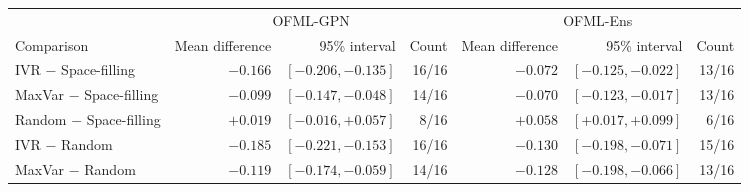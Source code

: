 \begin{tabular}{@{}l rrr rrr@{}}
\toprule
 & \multicolumn{3}{c}{OFML-GPN} & \multicolumn{3}{c}{OFML-Ens}\\
\cmidrule(lr){2-4}\cmidrule(l){5-7}
Comparison & Mean difference & 95\% interval & Count & Mean difference & 95\% interval & Count\\
\midrule
IVR $-$ Space-filling & $-0.166$ & $[-0.206,-0.135]$ & 16/16 & $-0.072$ & $[-0.125,-0.022]$ & 13/16 \\
MaxVar $-$ Space-filling & $-0.099$ & $[-0.147,-0.048]$ & 14/16 & $-0.070$ & $[-0.123,-0.017]$ & 13/16 \\
Random $-$ Space-filling & $+0.019$ & $[-0.016,+0.057]$ & 8/16 & $+0.058$ & $[+0.017,+0.099]$ & 6/16 \\
IVR $-$ Random & $-0.185$ & $[-0.221,-0.153]$ & 16/16 & $-0.130$ & $[-0.198,-0.071]$ & 15/16 \\
MaxVar $-$ Random & $-0.119$ & $[-0.174,-0.059]$ & 14/16 & $-0.128$ & $[-0.198,-0.066]$ & 13/16 \\
\bottomrule
\end{tabular}
